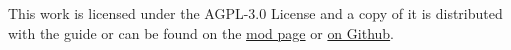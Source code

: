 This work is licensed under the AGPL-3.0 License and a copy of it is distributed with the guide or can 
be found on the \href{https://www.nexusmods.com/fallout4/mods/40555}{mod page} or \href{https://github.com/erri120/CBBEToFusionGirlGuide/blob/master/LICENSE}{on Github}.